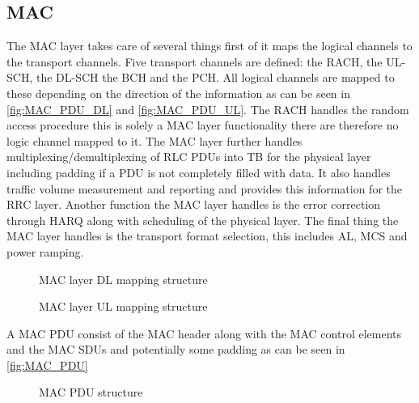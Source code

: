\subsection{MAC}

The \gls{MAC} layer takes care of several things first of it maps the logical channels to the transport channels. Five transport channels are defined: the \gls{RACH}, the \gls{UL-SCH}, the \gls{DL-SCH} the \gls{BCH} and the \gls{PCH}. All logical channels are mapped to these depending on the direction of the information as can be seen in \autoref{fig:MAC_PDU_DL} and \autoref{fig:MAC_PDU_UL}. The \gls{RACH} handles the random access procedure this is solely a \gls{MAC} layer functionality there are therefore no logic channel mapped to it. The \gls{MAC} layer further handles multiplexing/demultiplexing of \gls{RLC} \gls{PDU}s into \gls{TB} for the physical layer including padding if a \gls{PDU} is not completely filled with data. It also handles traffic volume measurement and reporting and provides this information for the \gls{RRC} layer. Another function the \gls{MAC} layer handles is the error correction through \gls{HARQ} along with scheduling of the physical layer. The final thing the \gls{MAC} layer handles is the transport format selection, this includes \gls{AL}, \gls{MCS} and power ramping.  

\captionsetup{belowskip=0em}
\begin{minipage}{0.48\textwidth}
	\begin{figure}[H]
	\centering
	\resizebox{\textwidth}{!}{
	}
	\caption{\gls{MAC} layer \gls{DL} mapping structure}
	\label{fig:MAC_PDU_DL}
	\end{figure}
\end{minipage}
\begin{minipage}{0.48\textwidth}
	\begin{figure}[H]
	\centering
	\resizebox{\textwidth}{!}{
	}
	\caption{\gls{MAC} layer \gls{UL} mapping structure}
	\label{fig:MAC_PDU_UL}
	\end{figure}
\end{minipage}
\captionsetup{belowskip=-1.5em}

A \gls{MAC} \gls{PDU} consist of the \gls{MAC} header along with the \gls{MAC} control elements and the \gls{MAC} \gls{SDU}s and potentially some padding as can be seen in \autoref{fig:MAC_PDU}

\begin{figure}[H]
\centering
\resizebox{\textwidth}{!}{
}
\caption{MAC PDU structure}
\label{fig:MAC_PDU}
\end{figure}


